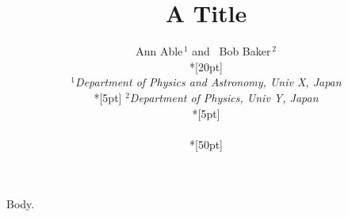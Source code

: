 \documentclass{article}
\begin{document}
\title{A Title}
\author{Ann Able$^{\,1}$
and~ Bob Baker$^{\,2}$
\\*[20pt]
{
\begin{minipage}{\linewidth}
$^1${\it\normalsize Department of Physics and Astronomy, Univ X, Japan }
\\*[5pt]
$^2${\it\normalsize Department of Physics, Univ Y, Japan}
\\*[5pt]
\end{minipage}
}
\\*[50pt]}
\maketitle
Body.
\end{document}
